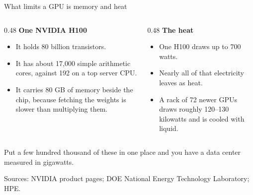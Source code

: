 \documentclass[aspectratio=169,11pt]{beamer}
\begin{document}
\begin{frame}{What limits a GPU is memory and heat}

\begin{columns}[T]
\begin{column}{0.48\textwidth}
\textbf{One NVIDIA H100}
\begin{itemize}\setlength\itemsep{0.25em}
    \item It holds 80 billion transistors.
    \item It has about 17,000 simple arithmetic cores, against 192 on a top server CPU.
    \item It carries 80 GB of memory beside the chip, because fetching the weights is slower than multiplying them.
\end{itemize}
\end{column}
\begin{column}{0.48\textwidth}
\textbf{The heat}
\begin{itemize}\setlength\itemsep{0.25em}
    \item One H100 draws up to 700 watts.
    \item Nearly all of that electricity leaves as heat.
    \item A rack of 72 newer GPUs draws roughly 120--130 kilowatts and is cooled with liquid.
\end{itemize}
\end{column}
\end{columns}

\vspace{0.35cm}

\alert{Put a few hundred thousand of these in one place and you have a data center measured in gigawatts.}

\vspace{0.1cm}
{\scriptsize\color{warmgray}Sources: NVIDIA product pages; DOE National Energy Technology Laboratory; HPE.}

\end{frame}
\end{document}
